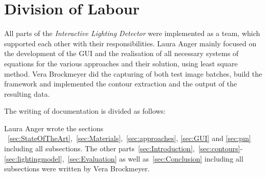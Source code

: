 \section{Division of Labour } \label{sec:Division}
All parts of the \textit{Interactive Lighting Detector} were implemented as a team, which supported each other with their responsibilities. Laura Anger mainly focused on the development of the GUI and the realisation of all necessary systems of equations for the various approaches and their solution, using least square method. Vera Brockmeyer did the capturing of both test image batches, build the framework and implemented the contour extraction and the output of the resulting data. 

The writing of documentation is divided as follows: 

Laura Anger wrote the sections ~\ref{sec:StateOfTheArt},~\ref{sec:Materials},~\ref{sec:approaches}, \ref{sec:GUI} and \ref{sec:pm} including all subsections. 
The other parts~\ref{sec:Introduction},~\ref{sec:contours}-\ref{sec:lightingmodel},~\ref{sec:Evaluation} as well as~\ref{sec:Conclusion} including all subsections were written by Vera Brockmeyer.

\newpage

























